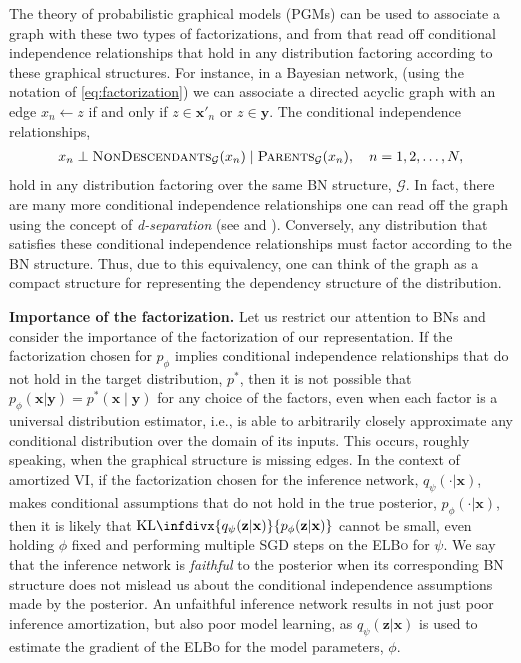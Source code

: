 The theory of probabilistic graphical models (PGMs) \citep{KollerFriedman2009} can be used to associate a graph with these two types of factorizations, and from that read off conditional independence relationships that hold in any distribution factoring according to these graphical structures. For instance, in a Bayesian network, (using the notation of \eqref{eq:factorization}) we can associate a directed acyclic graph with an edge $x_n\leftarrow z$ if and only if $z\in\mathbf{x}'_n$ or $z\in\mathbf{y}$. The conditional independence relationships,
\begin{align*}
	x_n\perp\text{\scshape NonDescendants}_\mathcal{G}(x_n)\mid\text{\scshape Parents}_\mathcal{G}(x_n),\ \ \ n=1,2,\ldots,N,
\end{align*}
hold in any distribution factoring over the same BN structure, $\mathcal{G}$. In fact, there are many more conditional independence relationships one can read off the graph using the concept of \emph{d-separation} (see \citep{KollerFriedman2009} and \citep[A.1]{WebbEtAl2018}). Conversely, any distribution that satisfies these conditional independence relationships must factor according to the BN structure. Thus, due to this equivalency, one can think of the graph as a compact structure for representing the dependency structure of the distribution.

{\bfseries Importance of the factorization.} Let us restrict our attention to BNs and consider the importance of the factorization of our representation. If the factorization chosen for $p_\phi$ implies conditional independence relationships that do not hold in the target distribution, $p^*$, then it is not possible that $p_\phi(\mathbf{x}|\mathbf{y})=p^*(\mathbf{x}\mid\mathbf{y})$ for any choice of the factors, even when each factor is a universal distribution estimator, i.e., is able to arbitrarily closely approximate any conditional distribution over the domain of its inputs. This occurs, roughly speaking, when the graphical structure is missing edges. In the context of amortized VI, if the factorization chosen for the inference network, $q_\psi(\cdot|\mathbf{x})$, makes conditional assumptions that do not hold in the true posterior, $p_\phi(\cdot|\mathbf{x})$, then it is likely that $\text{KL}\infdivx{q_\psi(\mathbf{z}|\mathbf{x})}{p_\phi(\mathbf{z}|\mathbf{x})}$ cannot be small, even holding $\phi$ fixed and performing multiple SGD steps on the {\scshape ELBo} for $\psi$. We say that the inference network is \emph{faithful} to the posterior when its corresponding BN structure does not mislead us about the conditional independence assumptions made by the posterior. An unfaithful inference network results in not just poor inference amortization, but also poor model learning, as $q_\psi(\mathbf{z}|\mathbf{x})$ is used to estimate the gradient of the {\scshape ELBo} for the model parameters, $\phi$.

